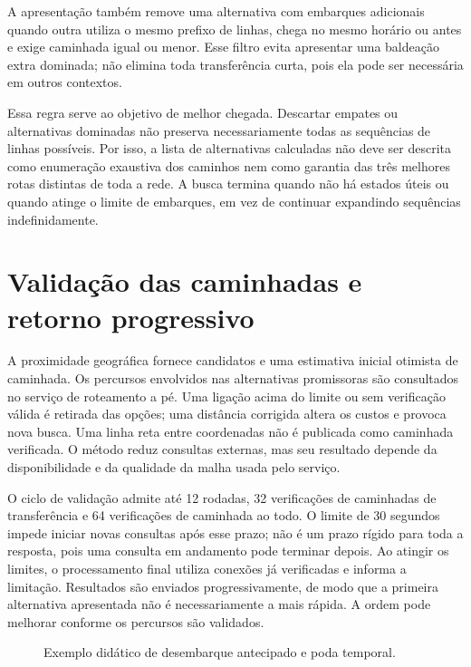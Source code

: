 \documentclass[12pt,oneside,a4paper,brazil,chapter=TITLE]{abntex2}
\let\papsection\section
\renewcommand{\section}{\clearpage\papsection}
\begin{document}
\begin{apendicesenv}
A apresentação também remove uma alternativa com embarques adicionais quando outra utiliza o mesmo prefixo de linhas, chega no mesmo horário ou antes e exige caminhada igual ou menor. Esse filtro evita apresentar uma baldeação extra dominada; não elimina toda transferência curta, pois ela pode ser necessária em outros contextos.

Essa regra serve ao objetivo de melhor chegada. Descartar empates ou alternativas dominadas não preserva necessariamente todas as sequências de linhas possíveis. Por isso, a lista de alternativas calculadas não deve ser descrita como enumeração exaustiva dos caminhos nem como garantia das três melhores rotas distintas de toda a rede. A busca termina quando não há estados úteis ou quando atinge o limite de embarques, em vez de continuar expandindo sequências indefinidamente.

\section{Validação das caminhadas e retorno progressivo}
A proximidade geográfica fornece candidatos e uma estimativa inicial otimista de caminhada. Os percursos envolvidos nas alternativas promissoras são consultados no serviço de roteamento a pé. Uma ligação acima do limite ou sem verificação válida é retirada das opções; uma distância corrigida altera os custos e provoca nova busca. Uma linha reta entre coordenadas não é publicada como caminhada verificada. O método reduz consultas externas, mas seu resultado depende da disponibilidade e da qualidade da malha usada pelo serviço.

O ciclo de validação admite até 12 rodadas, 32 verificações de caminhadas de transferência e 64 verificações de caminhada ao todo. O limite de 30 segundos impede iniciar novas consultas após esse prazo; não é um prazo rígido para toda a resposta, pois uma consulta em andamento pode terminar depois. Ao atingir os limites, o processamento final utiliza conexões já verificadas e informa a limitação. Resultados são enviados progressivamente, de modo que a primeira alternativa apresentada não é necessariamente a mais rápida. A ordem pode melhorar conforme os percursos são validados.


\begin{figure}[H]
\centering
\caption{Exemplo didático de desembarque antecipado e poda temporal.}\label{fig:grafo-poda}
\end{figure}


\end{apendicesenv}
\end{document}
